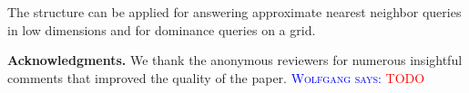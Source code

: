 \documentclass[a4paper,11pt]{article}
\newcommand{\?}{\mskip1.5mu}
\newcommand{\aremark}[3]{\textcolor{blue}{\textsc{#1 #2:}}
  \textcolor{red}{\textsf{#3}}}
\newcommand{\wolfgang}[2][says]{\aremark{Wolfgang}{#1}{#2}}
\begin{document}
The structure can be applied for answering approximate nearest
neighbor queries in low dimensions and for dominance queries on
a grid.


\bigskip
\noindent\textbf{Acknowledgments.}
We thank the anonymous reviewers for numerous
insightful comments that improved the quality of the paper.
\wolfgang{TODO}





\end{document}
